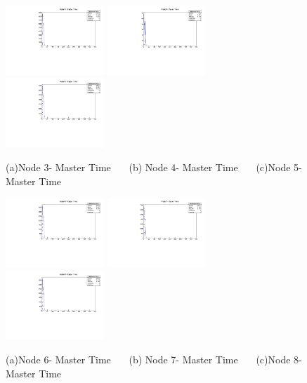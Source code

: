 \documentclass[a4paper,11pt]{article}
\theoremstyle{mytheor}
\begin{document}
\begin{figure}[H] 
\vspace*{-0.3cm} 
\includegraphics[width=0.33\textwidth,scale=0.5,trim=0 0 0 0,clip]{plotsdir/file0_muons-N3MasterTime-1.pdf} 
\includegraphics[width=0.33\textwidth,scale=0.5,trim=0 0 0 0,clip]{plotsdir/file0_muons-N4MasterTime-1.pdf} 
\includegraphics[width=0.33\textwidth,scale=0.5,trim=0 0 0 0,clip]{plotsdir/file0_muons-N5MasterTime-1.pdf} 
\caption{(a)Node 3- Master Time ~~~(b) Node 4- Master Time ~~~(c)Node 5- Master Time } 
\end{figure} 
\begin{figure}[H] 
\vspace*{-0.3cm} 
\includegraphics[width=0.33\textwidth,scale=0.5,trim=0 0 0 0,clip]{plotsdir/file0_muons-N6MasterTime-1.pdf} 
\includegraphics[width=0.33\textwidth,scale=0.5,trim=0 0 0 0,clip]{plotsdir/file0_muons-N7MasterTime-1.pdf} 
\includegraphics[width=0.33\textwidth,scale=0.5,trim=0 0 0 0,clip]{plotsdir/file0_muons-N8MasterTime-1.pdf} 
\caption{(a)Node 6- Master Time ~~~(b) Node 7- Master Time ~~~(c)Node 8- Master Time } 
\end{figure} 
\end{document}
